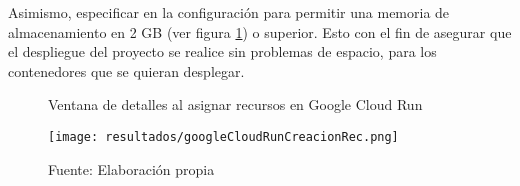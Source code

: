 Asimismo, especificar en la configuración para permitir una memoria de almacenamiento en 2 GB (ver figura \ref{fig:figuraGoogleCloudRunCreacionRec}) o superior. Esto con el fin de asegurar que el despliegue del proyecto se realice sin problemas de espacio, para los contenedores que se quieran desplegar.

\begin{figure}[h]
	\centering
	\caption{Ventana de detalles al asignar recursos en Google Cloud Run}
	\texttt{[image: resultados/googleCloudRunCreacionRec.png]}
	\caption*{\footnotesize Fuente: Elaboración propia}
	\label{fig:figuraGoogleCloudRunCreacionRec}
\end{figure}